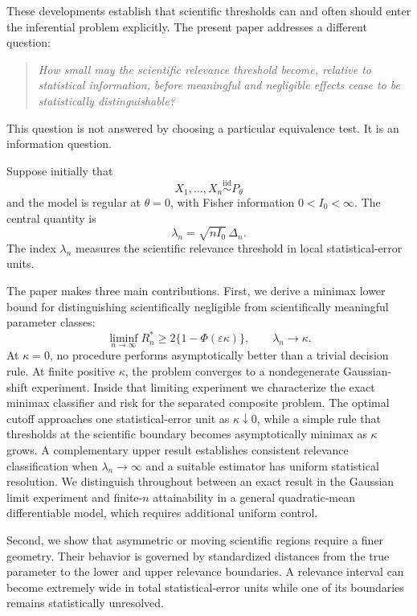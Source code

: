\documentclass[11pt]{article}
\theoremstyle{remark}
\begin{document}
These developments establish that scientific thresholds can and often should enter the inferential problem explicitly. The present paper addresses a different question:

\begin{quote}
\emph{How small may the scientific relevance threshold become, relative to statistical information, before meaningful and negligible effects cease to be statistically distinguishable?}
\end{quote}

This question is not answered by choosing a particular equivalence test. It is an information question.

Suppose initially that
\[
X_1,\ldots,X_n\stackrel{\mathrm{iid}}{\sim}P_\theta
\]
and the model is regular at $\theta=0$, with Fisher information $0<I_0<\infty$. The central quantity is
\begin{equation}
\lambda_n=\sqrt{nI_0}\,\Delta_n.
\label{eq:lambda}
\end{equation}
The index $\lambda_n$ measures the scientific relevance threshold in local statistical-error units.

The paper makes three main contributions. First, we derive a minimax lower bound for distinguishing scientifically negligible from scientifically meaningful parameter classes:
\begin{equation}
\liminf_{n\to\infty}R_n^*\ge 2\{1-\Phi(\varepsilon\kappa)\},
\qquad \lambda_n\to\kappa.
\label{eq:minimaxbound}
\end{equation}
At $\kappa=0$, no procedure performs asymptotically better than a trivial decision rule. At finite positive $\kappa$, the problem converges to a nondegenerate Gaussian-shift experiment. Inside that limiting experiment we characterize the exact minimax classifier and risk for the separated composite problem. The optimal cutoff approaches one statistical-error unit as $\kappa\downarrow0$, while a simple rule that thresholds at the scientific boundary becomes asymptotically minimax as $\kappa$ grows. A complementary upper result establishes consistent relevance classification when $\lambda_n\to\infty$ and a suitable estimator has uniform statistical resolution. We distinguish throughout between an exact result in the Gaussian limit experiment and finite-$n$ attainability in a general quadratic-mean differentiable model, which requires additional uniform control.

Second, we show that asymmetric or moving scientific regions require a finer geometry. Their behavior is governed by standardized distances from the true parameter to the lower and upper relevance boundaries. A relevance interval can become extremely wide in total statistical-error units while one of its boundaries remains statistically unresolved.
\end{document}
